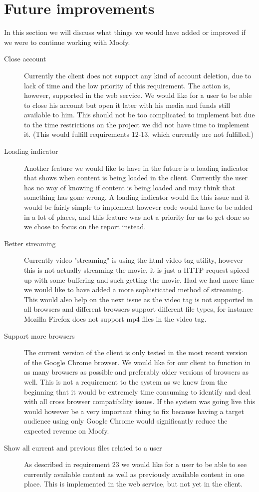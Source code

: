 \section{Future improvements}
\label{sec:futureimps}
In this section we will discuss what things we would have added or improved if we were to continue working with Moofy.

\begin{description}
\item[Close account] Currently the client does not support any kind of account
	deletion, due to lack of time and the low priority of this requirement.
	The action is, however, supported in the web service. We would like for
	a user to be able to close his account but open it later with his media
	and funds still available to him. This should not be too complicated to
	implement but due to the time restrictions on the project we did not
	have time to implement it. (This would fulfill requirements 12-13,
	which currently are not fulfilled.)

\item[Loading indicator] Another feature we would like to have in the future is
a loading indicator that shows when content is being loaded in the client.
Currently the user has no way of knowing if content is being loaded and may
think that something has gone wrong. A loading indicator would fix this issue
and it would be fairly simple to implement however code would have to be added
in a lot of places, and this feature was not a priority for us to get done so
we chose to focus on the report instead.

\item[Better streaming] Currently video "streaming" is using the html
video tag utility, however this is not actually streaming the movie, it is just
a HTTP request spiced up with some buffering and such getting the movie. Had we
had more time we would like to have added a more sophisticated method of
streaming. This would also help on the next issue as the video tag is not
supported in all browsers and different browsers support different file types,
for instance Mozilla Firefox does not support mp4 files in the video tag.

\item[Support more browsers] The current version of the client is only tested
in the most recent version of the Google Chrome browser. We would like for our
client to function in as many browsers as possible and preferably older
versions of browsers as well. This is not a requirement to the system as we
knew from the beginning that it would be extremely time consuming to identify
and deal with all cross browser compatibility issues. If the system was going
live this would however be a very important thing to fix because having a
target audience using only Google Chrome would significantly reduce the
expected revenue on Moofy.

\item[Show all current and previous files related to a user] As described in
	requirement 23 we would like for a user to be able to see currently
	available content as well as previously available content in one place.
	This is implemented in the web service, but not yet in the client.
\end{description}
